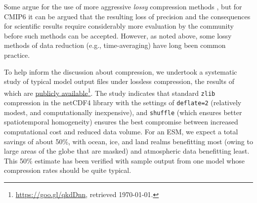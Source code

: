 \documentclass[gmd,manuscript]{copernicus}
\newcommand{\pllabel}[1]{\label{p-#1}\linelabel{l-#1}}
\newcommand{\urlref}[2] {\href{#1}{#2}\footnote{\url{#1}, retrieved \today.}}
\begin{document}
Some argue for the use of more aggressive
\emph{lossy} compression methods \citep{ref:bakeretal2016}, but 
for CMIP6 it can be argued that the resulting loss of precision
 and the consequences for scientific results
require considerably more evaluation by the community before such
methods can be accepted. However, as noted above,
some lossy methods of data reduction (e.g., time-averaging) have long
been common practice.

To help inform the discussion about compression, we undertook a systematic study of 
typical model output files under lossless compression, the
results of which are \urlref{https://goo.gl/qkdDnn}{publicly available}.
The study indicates that standard \texttt{zlib} compression in the
netCDF4 library with the settings of \texttt{deflate=2} (relatively
modest, and computationally inexpensive), and \texttt{shuffle} (which
ensures better spatiotemporal homogeneity) ensures the best compromise
between increased computational cost and reduced data volume. For an
ESM,
\pllabel{RC1-25}
we expect a total savings of about 50\%, with ocean, ice, and land realms
benefitting most (owing to large areas of the globe that are
masked) and atmospheric data benefitting least. This 50\% estimate has been
verified with sample output from one model whose compression rates should be quite typical.
\end{document}
